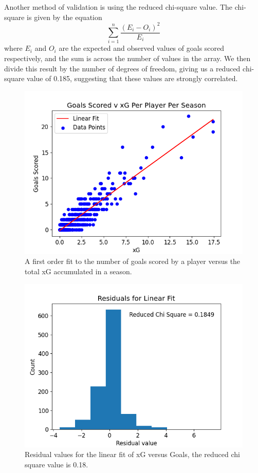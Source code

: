 \documentclass[12pt, a4paper, twocolumn]{article}
\begin{document}
Another method of validation is using the reduced chi-square value. The chi-square is given by the equation
\begin{equation}
\sum_{i=1}^n \frac{(E_i - O_i)^2}{E_i} 
\end{equation}
where $E_i$ and $O_i$ are the expected and observed values of goals scored respectively, and the sum is across the number of values in the array. We then divide this result by the number of degrees of freedom, giving us a reduced chi-square value of 0.185, suggesting that these values are strongly correlated.

\begin{figure}
  \includegraphics[width=\linewidth]{../vis/playerStats/goals_v_xg_linear_fit.png}
  \caption{A first order fit to the number of goals scored by a player versus the total xG accumulated in a season.}
  \label{xg_line}
\end{figure}

\begin{figure}
  \includegraphics[width=\linewidth]{../vis/playerStats/goals_v_xg_residuals.png}
  \caption{Residual values for the linear fit of xG versus Goals, the reduced chi square value is 0.18.}
  \label{res}
\end{figure}
\end{document}
